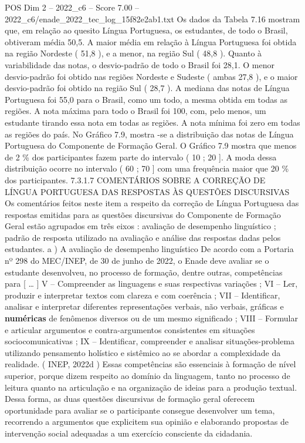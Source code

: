 \begin{textsample}{POS Dim 2 – 2022\_c6 – Score 7.00 – 2022\_c6/enade\_2022\_tec\_log\_15f82e2ab1.txt}
Os dados da Tabela 7.16 mostram que, em relação ao quesito Língua Portuguesa, os estudantes, de todo o Brasil, obtiveram média 50,5.
A maior média em relação à Língua Portuguesa foi obtida na região Nordeste ( 51,8 ), e a menor, na região Sul ( 48,8 ).
Quanto à variabilidade das notas, o desvio-padrão de todo o Brasil foi 28,1.
O menor desvio-padrão foi obtido nas regiões Nordeste e Sudeste ( ambas 27,8 ), e o maior desvio-padrão foi obtido na região Sul ( 28,7 ).
A mediana das notas de Língua Portuguesa foi 55,0 para o Brasil, como um todo, a mesma obtida em todas as regiões.
A nota máxima para todo o Brasil foi 100, com, pelo menos, um estudante tirando essa nota em todas as regiões.
A nota mínima foi zero em todas as regiões do país.
No Gráfico 7.9, mostra -se a distribuição das notas de Língua Portuguesa do Componente de Formação Geral.
O Gráfico 7.9 mostra que menos de 2 \% dos participantes fazem parte do intervalo ( 10 ; 20 ].
A moda dessa distribuição ocorre no intervalo ( 60 ; 70 ] com uma frequência maior que 20 \% dos participantes. 7.3.1.7 COMENTÁRIOS SOBRE A CORREÇÃO DE LÍNGUA PORTUGUESA DAS RESPOSTAS ÀS QUESTÕES DISCURSIVAS Os comentários feitos neste item a respeito da correção de Língua Portuguesa das respostas emitidas para as questões discursivas do Componente de Formação Geral estão agrupados em três eixos : avaliação de desempenho linguístico ; padrão de resposta utilizado na avaliação e análise das respostas dadas pelos estudantes. a ) A avaliação de desempenho linguístico De acordo com a Portaria nº 298 do MEC/INEP, de 30 de junho de 2022, o Enade deve avaliar se o estudante desenvolveu, no processo de formação, dentre outras, competências para [ … ] V – Compreender as linguagens e suas respectivas variações ; VI – Ler, produzir e interpretar textos com clareza e com coerência ; VII – Identificar, analisar e interpretar diferentes representações verbais, não verbais, gráficas e \textbf{numéricas} de fenômenos diversos ou de um mesmo significado ; VIII – Formular e articular argumentos e contra-argumentos consistentes em situações sociocomunicativas ; IX – Identificar, compreender e analisar situações-problema utilizando pensamento holístico e sistêmico ao se abordar a complexidade da realidade. ( INEP, 2022d ) Essas competências são essenciais à formação de nível superior, porque dizem respeito ao domínio da linguagem, tanto no processo de leitura quanto na articulação e na organização de ideias para a produção textual.
Dessa forma, as duas questões discursivas de formação geral oferecem oportunidade para avaliar se o participante consegue desenvolver um tema, recorrendo a argumentos que explicitem sua opinião e elaborando propostas de intervenção social adequadas a um exercício consciente da cidadania.

\end{textsample}

